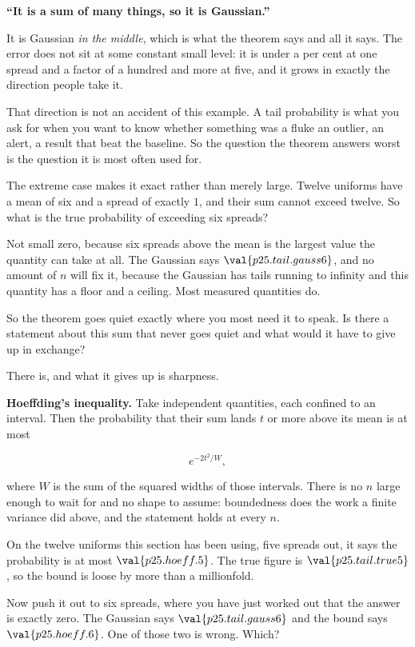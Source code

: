 \begin{fr}
\begin{trapbox}
\textbf{\enquote{It is a sum of many things, so it is Gaussian.}}

It is Gaussian \emph{in the middle}, which is what the theorem says and all it
says. The error does not sit at some constant small level: it is under a per
cent at one spread and a factor of a hundred and more at five, and it grows in
exactly the direction people take it.

That direction is not an accident of this example. A tail probability is what
you ask for when you want to know whether something was a fluke \dash{} an
outlier, an alert, a result that beat the baseline. So the question the
theorem answers worst is the question it is most often used for.
\end{trapbox}

The extreme case makes it exact rather than merely large. Twelve uniforms have
a mean of six and a spread of exactly $1$, and their sum cannot exceed twelve.
So what is the true probability of exceeding six spreads?
\dotline
\nextframe
\end{fr}

\begin{fr}

Not small \dash{} zero, because six spreads above the mean is the largest
value the quantity can take at all. The Gaussian says
$\val{p25.tail.gauss6}$, and no amount of $n$ will fix it, because the
Gaussian has tails running to infinity and this quantity has a floor and a
ceiling. Most measured quantities do.

So the theorem goes quiet exactly where you most need it to speak. Is there a
statement about this sum that never goes quiet \dash{} and what would it have
to give up in exchange?
\dotline
\nextframe
\end{fr}

\begin{fr}
\begin{ansblock}
There is, and what it gives up is sharpness.
\end{ansblock}

\textbf{Hoeffding's inequality.} Take independent quantities, each confined to
an interval. Then the probability that their sum lands $t$ or more above its
mean is at most

\[ e^{-2t^{2}/W}, \]

where $W$ is the sum of the squared widths of those intervals. There is no $n$
large enough to wait for and no shape to assume: boundedness does the work a
finite variance did above, and the statement holds at every $n$.

On the twelve uniforms this section has been using, five spreads out, it says
the probability is at most $\val{p25.hoeff.5}$. The true figure is
$\val{p25.tail.true5}$, so the bound is loose by more than a millionfold.

Now push it out to six spreads, where you have just worked out that the answer
is exactly zero. The Gaussian says $\val{p25.tail.gauss6}$ and the bound says
$\val{p25.hoeff.6}$. One of those two is wrong. Which?
\dotline
\nextframe
\end{fr}

